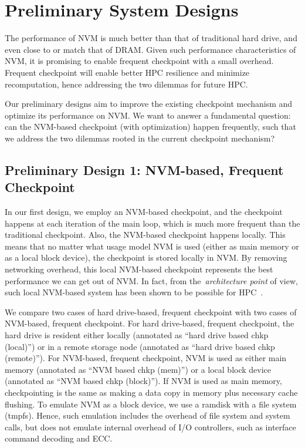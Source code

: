 \section{Preliminary System Designs}
\label{sec:prelim_design}
The performance of NVM is much better than that of traditional hard drive, and even close to or match that of DRAM. 
Given such performance characteristics of NVM, it is promising to enable 
frequent checkpoint with a small overhead.
Frequent checkpoint will enable better HPC resilience and minimize recomputation, hence addressing the two dilemmas for future HPC.

Our preliminary designs aim to improve the existing checkpoint mechanism and optimize its performance on NVM. We want to answer a fundamental question: can the NVM-based checkpoint (with optimization) happen frequently, such that we address the two dilemmas rooted in the current checkpoint mechanism?
 
\subsection{Preliminary Design 1: NVM-based, Frequent Checkpoint}
In our first design, we employ an NVM-based checkpoint, and the checkpoint
happens at each iteration of the main loop, which is much more frequent
than the traditional checkpoint.
Also, the NVM-based checkpoint happens locally. This means that no matter what usage model NVM is used (either as main memory or as a local block device), the checkpoint is stored locally in NVM. By removing networking overhead, this local NVM-based checkpoint represents the best performance we can get out of NVM.
In fact, from the~\textit{architecture point} of view, such local NVM-based system has been shown to be possible for HPC~\cite{ipdps13:kannan, ics15:gao, sc13:jung}.

We compare two cases of hard drive-based, frequent checkpoint
with two cases of NVM-based, frequent checkpoint. 
For hard drive-based, frequent checkpoint, 
the hard drive is resident either locally (annotated as ``hard drive based chkp (local)'') or in a remote storage node (annotated as ``hard drive based chkp (remote)''). 
For NVM-based, frequent checkpoint, NVM is used 
as either main memory (annotated as ``NVM based chkp (mem)'')
or a local block device (annotated as ``NVM based chkp (block)'').
If NVM is used as main memory, checkpointing is the same as
making a data copy in memory plus necessary cache flushing.
To emulate NVM as a block device, we use a ramdisk with a file system
(tmpfs). Hence, such emulation includes the overhead of file system and system calls, but does not emulate internal overhead of I/O controllers, such as interface command decoding and ECC. 

